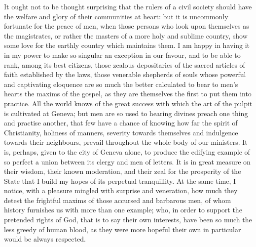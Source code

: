 \documentclass[12pt]{report}
\begin{document}
It ought not to be thought surprising that the rulers of a civil society should have the welfare and glory of their communities at heart: but it is uncommonly fortunate for the peace of men, when those persons who look upon themselves as the magistrates, or rather the masters of a more holy and sublime country, show some love for the earthly country which maintains them. I am happy in having it in my power to make so singular an exception in our favour, and to be able to rank, among its best citizens, those zealous depositaries of the sacred articles of faith established by the laws, those venerable shepherds of souls whose powerful and captivating eloquence are so much the better calculated to bear to men's hearts the maxims of the gospel, as they are themselves the first to put them into practice. All the world knows of the great success with which the art of the pulpit is cultivated at Geneva; but men are so used to hearing divines preach one thing and practise another, that few have a chance of knowing how far the spirit of Christianity, holiness of manners, severity towards themselves and indulgence towards their neighbours, prevail throughout the whole body of our ministers. It is, perhaps, given to the city of Geneva alone, to produce the edifying example of so perfect a union between its clergy and men of letters. It is in great measure on their wisdom, their known moderation, and their zeal for the prosperity of the State that I build my hopes of its perpetual tranquillity. At the same time, I notice, with a pleasure mingled with surprise and veneration, how much they detest the frightful maxims of those accursed and barbarous men, of whom history furnishes us with more than one example; who, in order to support the pretended rights of God, that is to say their own interests, have been so much the less greedy of human blood, as they were more hopeful their own in particular would be always respected.
\end{document}

